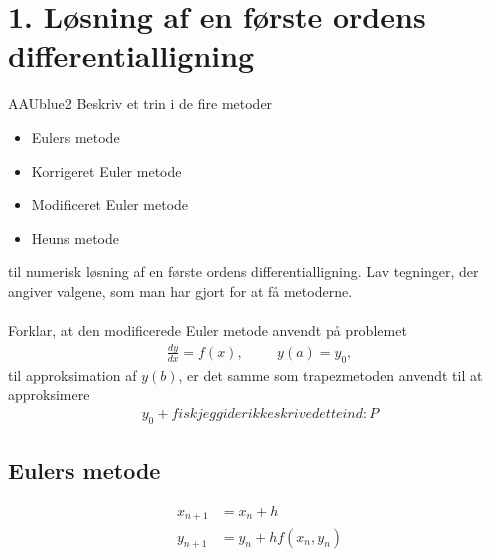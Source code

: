 \section*{1. Løsning af en første ordens differentialligning}
% 
%
\begin{color}{AAUblue2}
%
Beskriv et trin i de fire metoder 
% 
\begin{itemize}
\item Eulers metode 
\item Korrigeret Euler metode 
\item Modificeret Euler metode 
\item Heuns metode 
\end{itemize}
% 
til numerisk løsning af en første ordens differentialligning. 
Lav tegninger, der angiver valgene, som man har gjort for at få metoderne.  
\\\\
Forklar, at den modificerede Euler metode anvendt på problemet 
%
\begin{align*}
\frac{dy}{dx} = f(x), \phantom{heeej} y(a)= y_0,
\end{align*}
% 
til approksimation af $y(b)$, er det samme som trapezmetoden anvendt til at approksimere 
%
\begin{align*}
y_0 + fisk jeg gider ikke skrive dette ind :P
\end{align*}
% 
\end{color}
% 
% 
%
\subsection*{Eulers metode}

%
\begin{align*}
x_{n+1} & = x_n+h \\
y_{n+1} & = y_n + h f(x_n,y_n)
\end{align*}
% 

